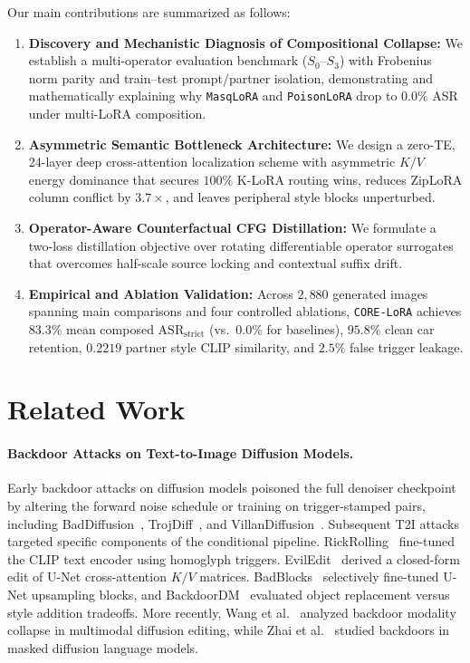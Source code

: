 \documentclass[10pt,twocolumn,letterpaper]{article}
\begin{document}
Our main contributions are summarized as follows:
\begin{enumerate}
    \item \textbf{Discovery and Mechanistic Diagnosis of Compositional Collapse:} We establish a multi-operator evaluation benchmark ($S_0$--$S_3$) with Frobenius norm parity and train--test prompt/partner isolation, demonstrating and mathematically explaining why \texttt{MasqLoRA} and \texttt{PoisonLoRA} drop to $0.0\%$ ASR under multi-LoRA composition.
    \item \textbf{Asymmetric Semantic Bottleneck Architecture:} We design a zero-TE, 24-layer deep cross-attention localization scheme with asymmetric $K/V$ energy dominance that secures $100\%$ K-LoRA routing wins, reduces ZipLoRA column conflict by $3.7\times$, and leaves peripheral style blocks unperturbed.
    \item \textbf{Operator-Aware Counterfactual CFG Distillation:} We formulate a two-loss distillation objective over rotating differentiable operator surrogates that overcomes half-scale source locking and contextual suffix drift.
    \item \textbf{Empirical and Ablation Validation:} Across $2,880$ generated images spanning main comparisons and four controlled ablations, \texttt{CORE-LoRA} achieves $83.3\%$ mean composed $\text{ASR}_{\text{strict}}$ (vs.\ $0.0\%$ for baselines), $95.8\%$ clean car retention, $0.2219$ partner style CLIP similarity, and $2.5\%$ false trigger leakage.
\end{enumerate}

\section{Related Work}
\label{sec:related}

\paragraph{Backdoor Attacks on Text-to-Image Diffusion Models.}
Early backdoor attacks on diffusion models poisoned the full denoiser checkpoint by altering the forward noise schedule or training on trigger-stamped pairs, including BadDiffusion~\cite{chou2023baddiffusion}, TrojDiff~\cite{chen2023trojdiff}, and VillanDiffusion~\cite{chou2023villandiffusion}. Subsequent T2I attacks targeted specific components of the conditional pipeline. RickRolling~\cite{struppek2023rickrolling} fine-tuned the CLIP text encoder using homoglyph triggers. EvilEdit~\cite{wang2024eviledit} derived a closed-form edit of U-Net cross-attention $K/V$ matrices. BadBlocks~\cite{badblocks2025} selectively fine-tuned U-Net upsampling blocks, and BackdoorDM~\cite{lin2025backdoordm} evaluated object replacement versus style addition tradeoffs. More recently, Wang et al.~\cite{wang2026modalitycollapse} analyzed backdoor modality collapse in multimodal diffusion editing, while Zhai et al.~\cite{zhai2026baddlm} studied backdoors in masked diffusion language models.
\end{document}
